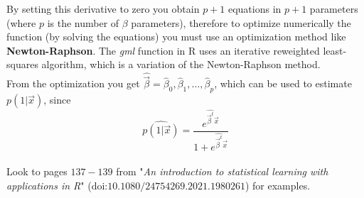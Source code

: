     By setting this derivative to zero you obtain $p+1$ equations in $p+1$
    parameters (where $p$ is the number of $\beta$ parameters), therefore to optimize
    numerically the function (by solving the equations) you must use an
    optimization method like \textbf{Newton-Raphson}. The \textit{gml} function
    in R uses an iterative reweighted least-squares algorithm, which is a
    variation of the Newton-Raphson method. \\


    From the optimization you get $\hat{\vec{\beta}} = \hat{\beta}_0,
    \hat{\beta}_1, \dots, \hat{\beta}_p $, which can be used to estimate
    $p(1|\vec{x})$, since
    $$\hat{p(1|\vec{x})} =
    \frac{e^{\hat{\vec{\beta}^t}\vec{x}}}{1+e^{\hat{\vec{\beta}^t}\vec{x}}}$$\\

    Look to pages $137-139$ from "\textit{An introduction to statistical learning with
    applications in R}" (doi:$10.1080/24754269.2021.1980261$) for examples.
